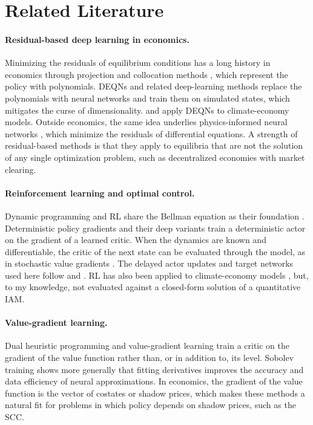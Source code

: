 \section{Related Literature}
\label{sec:related}

\paragraph{Residual-based deep learning in economics.} Minimizing the residuals of equilibrium conditions has a long history in economics through projection and collocation methods \parencite{Judd1992projection, JuddMailar2011}, which represent the policy with polynomials. DEQNs \parencite{Azinovic2022DEQN} and related deep-learning methods \parencite{Maliar2021, Kahou2021} replace the polynomials with neural networks and train them on simulated states, which mitigates the curse of dimensionality. \textcite{Folini2024ClimateInCE} and \textcite{friedl2023_deepUQ} apply DEQNs to climate-economy models. Outside economics, the same idea underlies physics-informed neural networks \parencite{Raissi2019PINN}, which minimize the residuals of differential equations. A strength of residual-based methods is that they apply to equilibria that are not the solution of any single optimization problem, such as decentralized economies with market clearing.

\paragraph{Reinforcement learning and optimal control.} Dynamic programming and RL share the Bellman equation as their foundation \parencite{Bertsekas2019RLOC, Sutton2018intro_to_rl}. Deterministic policy gradients \parencite{Silver2014DPG} and their deep variants \parencite{Lillicrap2016DDPG, Fujimoto2018TD3} train a deterministic actor on the gradient of a learned critic. When the dynamics are known and differentiable, the critic of the next state can be evaluated through the model, as in stochastic value gradients \parencite{Heess2015SVG}. The delayed actor updates and target networks used here follow \textcite{Fujimoto2018TD3} and \textcite{Lillicrap2016DDPG}. RL has also been applied to climate-economy models \parencite{strnard2019deepRLworld-earth, Wolf2023rl-to-iam}, but, to my knowledge, not evaluated against a closed-form solution of a quantitative IAM.

\paragraph{Value-gradient learning.} Dual heuristic programming \parencite{Werbos1992ADP} and value-gradient learning \parencite{Fairbank2012VGL} train a critic on the gradient of the value function rather than, or in addition to, its level. Sobolev training \parencite{Czarnecki2017Sobolev} shows more generally that fitting derivatives improves the accuracy and data efficiency of neural approximations. In economics, the gradient of the value function is the vector of costates or shadow prices, which makes these methods a natural fit for problems in which policy depends on shadow prices, such as the SCC.
